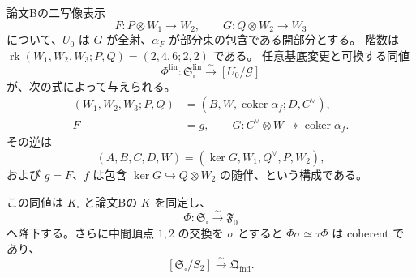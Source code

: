 \begin{theorem}
\label{thm:qa-square-normal-foundation-stack-equivalence}
論文Bの二写像表示
\[
 F:P\otimes W_1\to W_2,\qquad G:Q\otimes W_2\to W_3
\]
について、$U_0$ は $G$ が全射、$\alpha_F$ が部分束の包含である開部分とする。
階数は $\operatorname{rk}(W_1,W_2,W_3;P,Q)=(2,4,6;2,2)$ である。
任意基底変更と可換する同値
\[
 \Phi^{\mathrm{lin}}:\mathfrak S^{\mathrm{lin}}_\square
       \xrightarrow{\sim}[U_0/\mathcal G]
\]
が、次の式によって与えられる。
\[
 \begin{split}
 (W_1,W_2,W_3;P,Q)
   &=(B,W,\operatorname{coker}\alpha_f;D,C^\vee),\\
 F&=g,\qquad
 G:C^\vee\otimes W\twoheadrightarrow
             \operatorname{coker}\alpha_f.
 \end{split}
 \tag{SN}\label{eq:qa-square-to-normal-data}
\]
その逆は
\[
 (A,B,C,D,W)=(\ker G,W_1,Q^\vee,P,W_2),
 \tag{NS}\label{eq:qa-normal-to-square-data}
\]
および $g=F$、$f$ は包含 $\ker G\hookrightarrow Q\otimes W_2$
の随伴、という構成である。

この同値は $K_\square$ と論文Bの $K$ を同定し、
\[
 \Phi:\mathfrak S_\square\xrightarrow{\sim}\mathfrak F_0
\]
へ降下する。さらに中間頂点 $1,2$ の交換を $\sigma$ とすると
$\Phi\sigma\simeq\tau\Phi$ は coherent であり、
\[
 [\mathfrak S_\square/S_2]\xrightarrow{\sim}\mathfrak Q_{\mathrm{fnd}}.
\]
\end{theorem}
